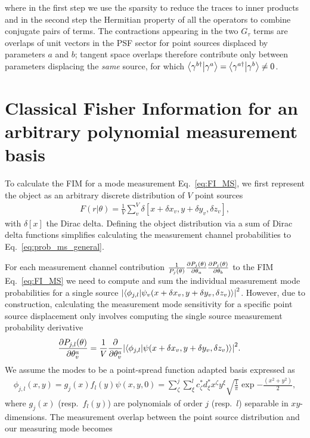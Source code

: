 \documentclass[reprint,amsmath,amssymb,aps,prl,floatfix,groupedaddress,superscriptaddress]{revtex4-2}
\begin{document}
where in the first step we use the sparsity to reduce the traces to inner products and in the second step the Hermitian property of all the operators to combine {\color{red}conjugate pairs of terms. The contractions appearing in the two $G_\tau$ terms are overlaps of unit vectors in the PSF sector for point sources displaced by parameters $a$ and $b$; tangent space overlaps therefore contribute only between parameters displacing the \emph{same} source, for which $\braket{\gamma^{b\dagger}}{\gamma^a} = \braket{\gamma^{a\dagger}}{\gamma^b} \neq 0$.}

\section{Classical Fisher Information for an arbitrary polynomial measurement basis\label{app:ms_incoherent}}
To calculate the FIM for a mode measurement Eq.~\eqref{eq:FI_MS}, we first represent the object as an arbitrary discrete distribution of $V$ point sources
\begin{align}
    F(r|\theta) = \frac{1}{V} \sum_v^V \delta \left [ x + \delta x_v, y + \delta y_v, \delta z_v \right ],
\end{align}
with $\delta[x]$ the Dirac delta. Defining the object distribution via a sum of Dirac delta functions simplifies calculating the measurement channel probabilities to Eq.~\eqref{eq:prob_ms_general}.

For each measurement channel contribution $\frac{1}{P_j(\theta)} \pdv{P_j(\theta)}{\theta_a}  \pdv{P_j(\theta)}{\theta_b}$ to the FIM Eq.~\eqref{eq:FI_MS} we need to compute and sum the individual measurement mode probabilities for a single source $\abs{ \braket{\phi_{j,l}}{\psi_v(x + \delta x_v, y + \delta y_v, \delta z_v)} }^2$. However, due to construction, calculating the measurement mode sensitivity for a specific point source displacement only involves computing the single source measurement probability derivative
\begin{align}
 \!\!   \pdv{P_{j,l}(\theta)}{\theta_v^a} &= \frac{1}{V} \pdv{}{\theta_v^a} \abs{\braket{\phi_{j,l}}{\psi(x + \delta x_v, y + \delta y_v, \delta z_v)}}^2.
 \label{eq:pdv_mode_dot_product}
\end{align}
We assume the modes to be a point-spread function adapted basis \cite{rehacek2017optimal} expressed as \begin{align}
    \phi_{j,l}(x,y) = g_j(x)f_l(y)\psi(x,y,0) = \sum_\zeta^j \sum_\xi^l c^*_\zeta d^*_\xi x^\zeta y^\xi \sqrt{\frac{1}{\pi}} \exp{-\frac{(x^2 + y^2)}{2}},
\end{align}
where $g_j(x)$ (resp.~$f_l(y)$) are polynomials of order $j$ (resp.~$l$) separable in $xy$-dimensions. The measurement overlap between the point source distribution and our measuring mode becomes
\end{document}
